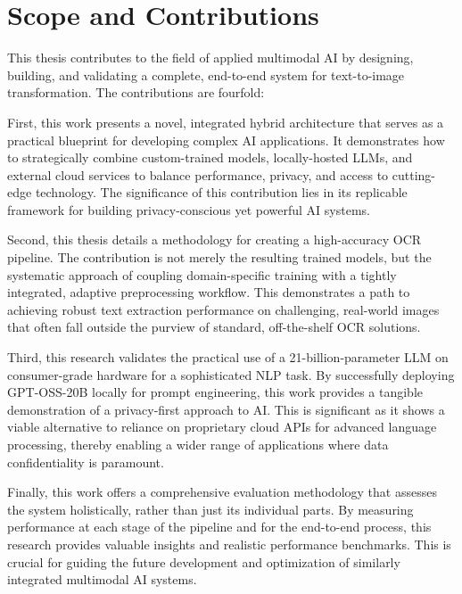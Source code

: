 \section{Scope and Contributions}
This thesis contributes to the field of applied multimodal AI by designing, building, and validating a complete, end-to-end system for text-to-image transformation. The contributions are fourfold:

First, this work presents a novel, integrated hybrid architecture that serves as a practical blueprint for developing complex AI applications. It demonstrates how to strategically combine custom-trained models, locally-hosted LLMs, and external cloud services to balance performance, privacy, and access to cutting-edge technology. The significance of this contribution lies in its replicable framework for building privacy-conscious yet powerful AI systems.

Second, this thesis details a methodology for creating a high-accuracy OCR pipeline. The contribution is not merely the resulting trained models, but the systematic approach of coupling domain-specific training with a tightly integrated, adaptive preprocessing workflow. This demonstrates a path to achieving robust text extraction performance on challenging, real-world images that often fall outside the purview of standard, off-the-shelf OCR solutions.

Third, this research validates the practical use of a 21-billion-parameter LLM on consumer-grade hardware for a sophisticated NLP task. By successfully deploying GPT-OSS-20B locally for prompt engineering, this work provides a tangible demonstration of a privacy-first approach to AI. This is significant as it shows a viable alternative to reliance on proprietary cloud APIs for advanced language processing, thereby enabling a wider range of applications where data confidentiality is paramount.

Finally, this work offers a comprehensive evaluation methodology that assesses the system holistically, rather than just its individual parts. By measuring performance at each stage of the pipeline and for the end-to-end process, this research provides valuable insights and realistic performance benchmarks. This is crucial for guiding the future development and optimization of similarly integrated multimodal AI systems.

